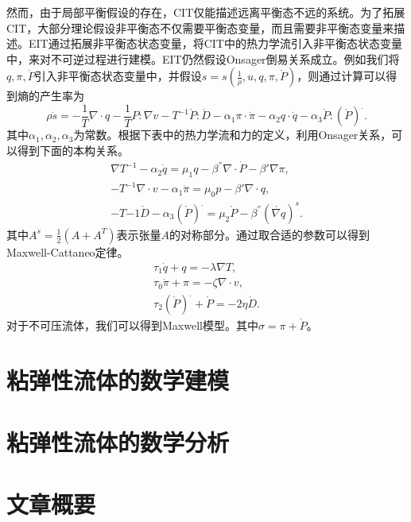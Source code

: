 \documentclass{article}
\begin{document}
然而，由于局部平衡假设的存在，CIT仅能描述远离平衡态不远的系统。为了拓展CIT，大部分理论假设非平衡态不仅需要平衡态变量，而且需要非平衡态变量来描述。EIT通过拓展非平衡态状态变量，将CIT中的热力学流引入非平衡态状态变量中，来对不可逆过程进行建模。EIT仍然假设Onsager倒易关系成立。例如我们将$q,\pi,\mathring{P}$引入非平衡态状态变量中，并假设$s = s(\frac{1}{\rho}, u,q,\pi,\mathring{P} )$，则通过计算可以得到熵的产生率为
\begin{equation*}
		\rho \dot{s} = - \frac{1}{T} \nabla \cdot q - \frac{1}{T} P: \nabla v - T^{-1} \mathring{P} : \mathring{D} - \alpha_1 \pi \cdot \dot{\pi} - \alpha_2 q \cdot \dot{q} - \alpha_3 \mathring{P} : ({\mathring{P} })^. .
\end{equation*}
其中$\alpha_1,\alpha_2,\alpha_3$为常数。根据下表中的热力学流和力的定义，利用Onsager关系，可以得到下面的本构关系。
\begin{eqnarray}
	\nabla T^{-1} - \alpha_2 \dot{q} = \mu_1 q - \beta^{''}\nabla \cdot \dot{P} - \beta' \nabla \pi, \\
	-T^{-1} \nabla \cdot v - \alpha_1 \dot{\pi} = \mu_0 p - \beta' \nabla \cdot q , \\
	-T{-1} \mathring{D} - \alpha_3 (\mathring{P})^. = \mu_2 \mathring{P} - \beta^{''} (\mathring{\nabla q})^s. 
\end{eqnarray}
其中$A^s = \frac{1}{2} (A+A^T)$表示张量$A$的对称部分。通过取合适的参数可以得到Maxwell-Cattaneo定律。
\begin{eqnarray}
	\tau_1 \dot{q} + q = - \lambda \nabla T, \\
 	\tau_0 \dot{\pi } + \pi = -\zeta \nabla \cdot v, \\
 	\tau_2 (\mathring{P})^. + \mathring{P} = -2 \eta \mathring{D}.
\end{eqnarray}
对于不可压流体，我们可以得到Maxwell模型。其中$\sigma = \pi + \mathring{P} $。 






\section{粘弹性流体的数学建模}

\section{粘弹性流体的数学分析}

\section{文章概要}
\end{document}
